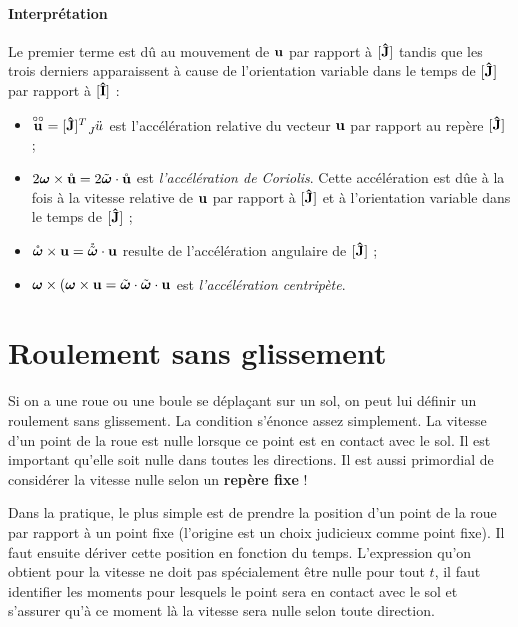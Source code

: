 \paragraph{Interprétation}

Le premier terme est dû au mouvement de ${\bf u}$ par rapport à $[{\bf\hat{J}}]$ tandis que les trois derniers apparaissent à cause de l'orientation variable dans le temps de $[{\bf\hat{J}}]$ par rapport à $[{\bf\hat{I}}]$ :

\begin{itemize}
	\item $\fvrr{u} = [\uj]^T \wrt{J}{\ddot{u}}$ est l'accélération relative du vecteur ${\bf u}$ par rapport au repère $[{\bf\hat{J}}]$ ;
	\item $2 {\bm \omega} \times \mathring{\bf u} = 2 \tilde{\bm \omega} \cdot \mathring{\bf u}$ est \textit{l'accélération de Coriolis}. Cette accélération est dûe à la fois à la vitesse relative de ${\bf u}$ par rapport à $[{\bf\hat{J}}]$ et à l'orientation variable dans le temps de $[{\bf\hat{J}}]$ ;
	\item $\mathring{\bm \omega} \times {\bf u} = \mathring{\tilde{\bm \omega}} \cdot {\bf u}$ resulte de l'accélération angulaire de $[{\bf\hat{J}}]$ ;
	\item ${\bm \omega} \times ({\bm \omega} \times {\bf u} = \tilde{\bm \omega} \cdot \tilde{\bm \omega} \cdot {\bf u}$ est 
	\textit{l'accélération centripète}.
\end{itemize}

\section{Roulement sans glissement}

Si on a une roue ou une boule se déplaçant sur un sol, on peut lui définir un roulement sans glissement.
La condition s'énonce assez simplement.
La vitesse d'un point de la roue est nulle lorsque ce point est en contact avec le sol.
Il est important qu'elle soit nulle dans toutes les directions.
Il est aussi primordial de considérer la vitesse nulle selon un {\bf repère fixe} !

Dans la pratique, le plus simple est de prendre la position d'un point de la roue par rapport à un point fixe (l'origine est un choix judicieux comme point fixe).
Il faut ensuite dériver cette position en fonction du temps.
L'expression qu'on obtient pour la vitesse ne doit pas spécialement être nulle pour tout $t$, il faut identifier les moments pour lesquels le point sera en contact avec le sol et s'assurer qu'à ce moment là la vitesse sera nulle selon toute direction.

